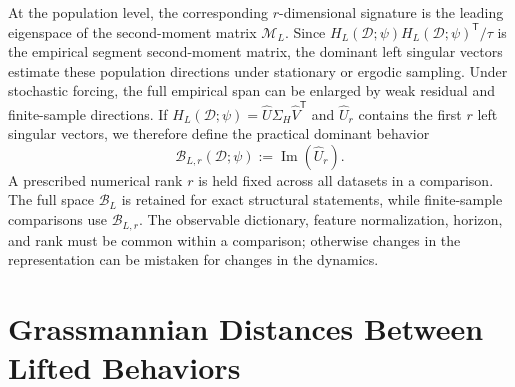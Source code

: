 \documentclass[letterpaper, 10 pt, conference]{ieeeconf}  %
\DeclareMathOperator*{\im}{Im}
\newcommand{\T}{^{\mathsf T}}
\begin{document}
At the population level, the corresponding $r$-dimensional signature is the leading eigenspace of the second-moment matrix $\mathcal M_L$. Since $H_L(\mathcal D;\psi)H_L(\mathcal D;\psi)\T/\tau$ is the empirical segment second-moment matrix, the dominant left singular vectors estimate these population directions under stationary or ergodic sampling.
Under stochastic forcing, the full empirical span can be enlarged by weak residual and finite-sample directions. If $H_L(\mathcal D;\psi)=\widehat U\Sigma_H\widehat V\T$ and $\widehat U_r$ contains the first $r$ left singular vectors, we therefore define the practical dominant behavior
\begin{equation}
  \mathcal B_{L,r}(\mathcal D;\psi):=\im(\widehat U_r).
  \label{eq:dominant_behavior_subspace}
\end{equation}
A prescribed numerical rank $r$ is held fixed across all datasets in a comparison. The full space $\mathcal B_L$ is retained for exact structural statements, while finite-sample comparisons use $\mathcal B_{L,r}$. The observable dictionary, feature normalization, horizon, and rank must be common within a comparison; otherwise changes in the representation can be mistaken for changes in the dynamics.











\section{Grassmannian Distances Between Lifted Behaviors}
\label{sec:grassmann}
\end{document}
